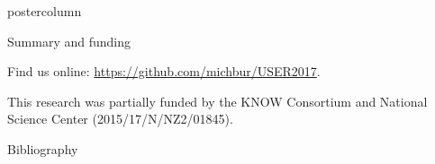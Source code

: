\documentclass[final]{beamer}\usepackage[]{graphicx}\usepackage[]{color}
\begin{document}
\begin{frame}
\begin{columns}
\begin{column}{.48\textwidth}
\begin{beamercolorbox}[center,wd=\textwidth]{postercolumn}
\begin{minipage}[T]{.95\textwidth}
{\begin{block}{Summary and funding}
\bigskip

Find us online: \url{https://github.com/michbur/USER2017}.

\small{This research was partially funded by the KNOW Consortium and National Science Center (2015/17/N/NZ2/01845).}

\end{block}
\vfill

 \begin{block}{Bibliography}
  \tiny{
  
  
  }
  \end{block}
  \vfill  


}
\end{minipage}
\end{beamercolorbox}
\end{column}
\end{columns}  
\end{frame}
\end{document}
